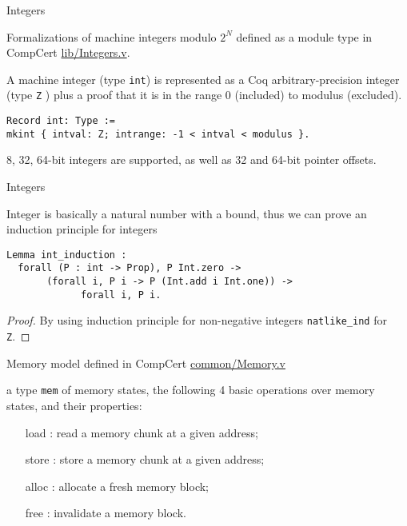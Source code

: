 \documentclass{beamer}
\begin{document}
\begin{frame}[t,fragile]{Integers}

Formalizations of machine integers modulo $2^N$ defined as a module type in CompCert \url{lib/Integers.v}.\\

\bigskip

A machine integer (type \texttt{int}) is represented as a Coq arbitrary-precision
integer (type \texttt{Z} ) plus a proof that it is in the range 0 (included) to
modulus (excluded).

\bigskip

\begin{lstlisting}[language=Coq]
Record int: Type :=
mkint { intval: Z; intrange: -1 < intval < modulus }.
\end{lstlisting}

8, 32, 64-bit integers are supported, as well as 32 and 64-bit pointer offsets.

\end{frame}

\begin{frame}[t,fragile]{Integers}

 Integer is basically a natural number with a bound, thus we can prove an induction principle for integers

\bigskip

\begin{lstlisting}[language=Coq]
  Lemma int_induction :
  forall (P : int -> Prop), P Int.zero ->
       (forall i, P i -> P (Int.add i Int.one)) ->
             forall i, P i.
\end{lstlisting}

 \begin{proof}

   By using induction principle for non-negative integers \texttt{natlike\_ind} for \texttt{Z}.
                                       
 \end{proof}



\end{frame}




\begin{frame}{Memory model}
defined in CompCert \url{common/Memory.v}

\bigskip
a type \texttt{mem} of memory states, the following 4 basic
operations over memory states, and their properties:
\begin{itemize}
\item [load]: read a memory chunk at a given address;
\item [store]: store a memory chunk at a given address;
\item [alloc]: allocate a fresh memory block;
\item [free]: invalidate a memory block.
\end{itemize}
\end{frame}
\end{document}
